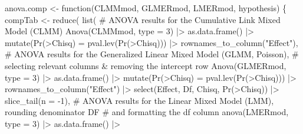 \documentclass[
  bookmarksnumbered]{article}
\newenvironment{Shaded}{\begin{snugshade}}{\end{snugshade}}
\newcommand{\AttributeTok}[1]{\textcolor[rgb]{0.80,0.80,0.80}{#1}}
\newcommand{\CommentTok}[1]{\textcolor[rgb]{0.50,0.62,0.50}{#1}}
\newcommand{\ControlFlowTok}[1]{\textcolor[rgb]{0.94,0.87,0.69}{#1}}
\newcommand{\DecValTok}[1]{\textcolor[rgb]{0.86,0.86,0.80}{#1}}
\newcommand{\FunctionTok}[1]{\textcolor[rgb]{0.94,0.94,0.56}{#1}}
\newcommand{\NormalTok}[1]{\textcolor[rgb]{0.80,0.80,0.80}{#1}}
\newcommand{\OtherTok}[1]{\textcolor[rgb]{0.94,0.94,0.56}{#1}}
\newcommand{\SpecialCharTok}[1]{\textcolor[rgb]{0.86,0.64,0.64}{#1}}
\newcommand{\StringTok}[1]{\textcolor[rgb]{0.80,0.58,0.58}{#1}}
\begin{document}
\begin{Shaded}
\begin{Highlighting}[]
\NormalTok{anova.comp }\OtherTok{\textless{}{-}} \ControlFlowTok{function}\NormalTok{(CLMMmod, GLMERmod, LMERmod, hypothesis) \{}
\NormalTok{  compTab }\OtherTok{\textless{}{-}} 
    \FunctionTok{reduce}\NormalTok{(}
      \FunctionTok{list}\NormalTok{(}
        \CommentTok{\# ANOVA results for the Cumulative Link Mixed Model (CLMM)}
        \FunctionTok{Anova}\NormalTok{(CLMMmod, }\AttributeTok{type =} \DecValTok{3}\NormalTok{) }\SpecialCharTok{|\textgreater{}}
          \FunctionTok{as.data.frame}\NormalTok{() }\SpecialCharTok{|\textgreater{}}
          \FunctionTok{mutate}\NormalTok{(}\StringTok{\textasciigrave{}}\AttributeTok{Pr(\textgreater{}Chisq)}\StringTok{\textasciigrave{}} \OtherTok{=} \FunctionTok{pval.lev}\NormalTok{(}\StringTok{\textasciigrave{}}\AttributeTok{Pr(\textgreater{}Chisq)}\StringTok{\textasciigrave{}}\NormalTok{)) }\SpecialCharTok{|\textgreater{}} 
          \FunctionTok{rownames\_to\_column}\NormalTok{(}\StringTok{"Effect"}\NormalTok{),}
        \CommentTok{\# ANOVA results for the Generalized Linear Mixed Model (GLMM, Poisson),}
        \CommentTok{\# selecting relevant columns \& removing the intercept row}
        \FunctionTok{Anova}\NormalTok{(GLMERmod, }\AttributeTok{type =} \DecValTok{3}\NormalTok{) }\SpecialCharTok{|\textgreater{}}
          \FunctionTok{as.data.frame}\NormalTok{() }\SpecialCharTok{|\textgreater{}}
          \FunctionTok{mutate}\NormalTok{(}\StringTok{\textasciigrave{}}\AttributeTok{Pr(\textgreater{}Chisq)}\StringTok{\textasciigrave{}} \OtherTok{=} \FunctionTok{pval.lev}\NormalTok{(}\StringTok{\textasciigrave{}}\AttributeTok{Pr(\textgreater{}Chisq)}\StringTok{\textasciigrave{}}\NormalTok{)) }\SpecialCharTok{|\textgreater{}} 
          \FunctionTok{rownames\_to\_column}\NormalTok{(}\StringTok{"Effect"}\NormalTok{) }\SpecialCharTok{|\textgreater{}}
          \FunctionTok{select}\NormalTok{(Effect, Df, Chisq, }\StringTok{\textasciigrave{}}\AttributeTok{Pr(\textgreater{}Chisq)}\StringTok{\textasciigrave{}}\NormalTok{) }\SpecialCharTok{|\textgreater{}}
          \FunctionTok{slice\_tail}\NormalTok{(}\AttributeTok{n =} \SpecialCharTok{{-}}\DecValTok{1}\NormalTok{),}
        \CommentTok{\# ANOVA results for the Linear Mixed Model (LMM), rounding denominator DF}
        \CommentTok{\# and formatting the df column}
        \FunctionTok{anova}\NormalTok{(LMERmod, }\AttributeTok{type =} \DecValTok{3}\NormalTok{) }\SpecialCharTok{|\textgreater{}}
          \FunctionTok{as.data.frame}\NormalTok{() }\SpecialCharTok{|\textgreater{}}

\end{Highlighting}
\end{Shaded}
\end{document}
